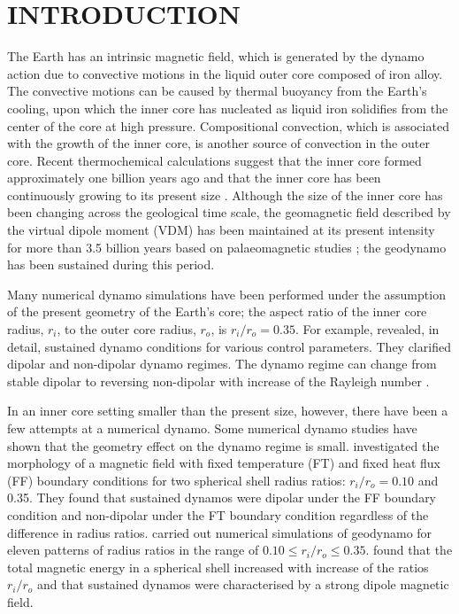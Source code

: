 \section{INTRODUCTION}

The Earth has an intrinsic magnetic field, which is generated by the dynamo action due to convective motions in the liquid outer core composed of iron alloy.
The convective motions can be caused by thermal buoyancy from the Earth's cooling, upon which the inner core has nucleated as liquid iron solidifies from the center of the core at high pressure.
Compositional convection, which is associated with the growth of the inner core, is another source of convection in the outer core.
Recent thermochemical calculations suggest that the inner core formed approximately one billion years ago and that the inner core has been continuously growing to its present size \citep{Labrosse:2001}.
Although the size of the inner core has been changing across the geological time scale, the geomagnetic field described by the virtual dipole moment (VDM) has been maintained at its present intensity for more than 3.5 billion years based on palaeomagnetic studies \citep{Biggin:2015}; the geodynamo has been sustained during this period.

Many numerical dynamo simulations have been performed under the assumption of the present geometry of the Earth’s core; the aspect ratio of the inner core radius, $r_{i}$, to the outer core radius, $r_{o}$, is $r_{i} / r_{o} = 0.35$.
%
For example, \citet{Uli:2006} revealed, in detail, sustained dynamo conditions for various control parameters. 
They clarified dipolar and non-dipolar dynamo regimes.
The dynamo regime can change from stable dipolar to reversing non-dipolar with increase of the Rayleigh number \citep{Kutzner:2002,Olson:2011}.

In an inner core setting smaller than the present size, however, there have been a few attempts at a numerical dynamo. 
%
Some numerical dynamo studies have shown that the geometry effect on the dynamo regime is small. 
\citet{Hori:2010} investigated the morphology of a magnetic field with fixed temperature (FT) and fixed heat flux (FF) boundary conditions for two spherical shell radius ratios: $r_{i} / r_{o} = 0.10$ and 0.35. 
They found that sustained dynamos were dipolar under the FF boundary condition and non-dipolar under the FT boundary condition regardless of the difference in radius ratios. 
\citet{Driscoll:2016} carried out numerical simulations of geodynamo for eleven patterns of radius ratios in the range of $0.10 \le r_{i} / r_{o} \le 0.35$.
\citet{Driscoll:2016} found that the total magnetic energy in a spherical shell increased with increase of the ratios $r_{i} / r_{o}$ and that sustained dynamos were characterised by a strong dipole magnetic field.

